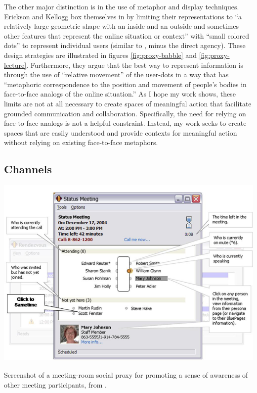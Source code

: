 \documentclass{tufte-handout}
\begin{document}
The other major distinction is in the use of metaphor and display techniques. Erickson and Kellogg box themselves in by limiting their representations to ``a relatively large geometric shape with an inside and an outside and sometimes other features that represent the online situation or context'' \citep{Erickson:2003td} with ``small colored dots'' to represent individual users (similar to \citep{Viegas:1999kv}, minus the direct agency). These design strategies are illustrated in figures \ref{fig:proxy-babble} and \ref{fig:proxy-lecture}. Furthermore, they argue that the best way to represent information is through the use of ``relative movement'' of the user-dots in a way that has ``metaphoric correspondence to the position and movement of people's bodies in face-to-face analogs of the online situation.'' \citep{Erickson:2003td} As I hope my work shows, these limits are not at all necessary to create spaces of meaningful action that facilitate grounded communication and collaboration. Specifically, the need for relying on face-to-face analogs is not a helpful constraint. Instead, my work seeks to create spaces that are easily understood and provide contexts for meaningful action without relying on existing face-to-face metaphors.



\subsection{Channels}

\begin{marginfigure}
	\includegraphics{figures/kellog_social_proxies.png}
	\caption{Screenshot of a meeting-room social proxy for promoting a sense of awareness of other meeting participants, from \citep{kellogg_leveraging_2006}.}
	\label{fig:social-proxies}
\end{marginfigure}
\end{document}

